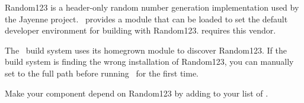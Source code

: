 Random123 is a header-only random number generation implementation used by the Jayenne project. \draco\ provides a module that can be loaded to set the default developer environment for building with Random123.   requires this vendor.

The \draco\ build system uses its homegrown  module to discover Random123.  If the build system is finding the wrong installation of Random123, you can manually set  to the full path before running \cmake\ for the first time.

Make your component depend on Random123 by adding  to your list of .

%
%
%
%
%
